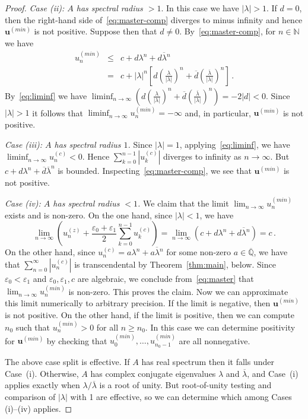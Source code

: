 \documentclass[a4paper,UKenglish,cleveref, autoref, thm-restate]{lipics-v2021}
\begin{document}
\begin{proof}
\emph{Case (ii): $A$ has spectral radius $>1$}.  In this case we have $|\lambda|>1$.
If $d=0$, then the right-hand side of~\eqref{eq:master-comp} diverges to minus infinity and hence $\boldsymbol u^{(min)}$ is not positive.
Suppose then that $d\neq 0$.  By~\eqref{eq:master-comp}, for $n \in \mathbb N$ we have 
\begin{eqnarray*}
    u_n^{(min)} & \leq & c+ d\lambda^n + \overline{d\lambda^n}\\
    &=& c + |\lambda|^n \left[d \left(\frac{\lambda}{|\lambda|}\right)^n+ \overline{d} \left(\frac{\overline \lambda}{|\lambda|}\right)^n\right] \, .
\end{eqnarray*}
By~\eqref{eq:liminf} we have $\liminf_{n\rightarrow \infty} \left( d \left(\frac{\lambda}{|\lambda|}\right)^n+ \overline{d} \left(\frac{\overline \lambda}{|\lambda|}\right)^n\right)
=-2|d|<0$.  Since $|\lambda|>1$ it follows that 
$\liminf_{n\rightarrow \infty} u_n^{(min)}=-\infty$ and, in particular,
$\boldsymbol u^{(min)}$ is not positive.  

\emph{Case (iii): $A$ has spectral radius $1$.}  Since
$|\lambda|=1$, applying~\eqref{eq:liminf},  we have $\liminf_{n\rightarrow \infty} u_n^{(c)}<0$.  Hence 
$\sum_{k=0}^{n-1} |u^{(c)}_k|$ diverges to infinity as $n \rightarrow \infty$. But  
$c+d\lambda^n+\overline{d}\overline{\lambda}^n$ is bounded.  Inspecting~\eqref{eq:master-comp}, we see that
$\boldsymbol u^{(min)}$ is not positive.

\emph{Case (iv): $A$ has spectral radius $<1$.}
We claim that the limit $\lim_{n\rightarrow\infty} u_n^{(min)}$ exists and is non-zero.  
On the one hand, since $|\lambda|<1$, we have 
\[\lim_{n\rightarrow\infty} \left(u_n^{(z)}+\frac{\varepsilon_0+\varepsilon_1}{2}\sum_{k=0}^{n-1} u_k^{(c)}\right)= \lim_{n\rightarrow\infty} \left(c+d\lambda^n + \overline{d\lambda^n} \right)= c\, .\]
On the other
hand, since $u_n^{(c)} = a\lambda^n + \overline{a\lambda^n}$ for
some non-zero $a\in \overline{\mathbb Q}$, we have that
$\sum_{n=0}^\infty |u_n^{(c)}|$ is transcendental by
Theorem~\ref{thm:main}, below.
Since $\varepsilon_0<\varepsilon_1$ and $\varepsilon_0,\varepsilon_1,c$ are algebraic,
we conclude from~\eqref{eq:master} that $\lim_{n\rightarrow\infty} u_n^{(min)}$
is non-zero.  This proves the claim.  Now we can approximate  this limit numerically to arbitrary precision.
If the limit is negative, then 
$\boldsymbol{u}^{(min)}$ is not positive.  On the other hand, if the limit is positive, then we can compute $n_0$ such that
$u_n^{(min)}>0$ for all $n\geq n_0$. In this case we can determine positivity for $\boldsymbol u^{(min)}$ by checking that 
$u_0^{(min)},\ldots,u_{n_0-1}^{(min)}$ are all nonnegative.

The above case split is effective.  If $A$ has real spectrum then it falls under Case~(i).  Otherwise,
$A$ has complex conjugate eigenvalues $\lambda$ and $\overline{\lambda}$, and Case~(i) applies 
exactly when $\lambda / \overline{\lambda}$ is a root of unity.  But root-of-unity testing and comparison of $|\lambda|$ with 1 are effective, so we can determine 
which among Cases (i)--(iv) applies.
\end{proof}
\end{document}
